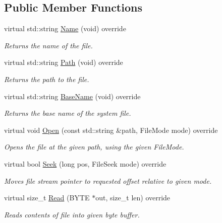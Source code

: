 \subsection*{Public Member Functions}
\begin{DoxyCompactItemize}
\item 
virtual std\+::string \hyperlink{classHatchit_1_1Core_1_1File_acf299b9ad7d5362e69ce5e2da1613887}{Name} (void) override
\begin{DoxyCompactList}\small\item\em Returns the name of the file. \end{DoxyCompactList}\item 
virtual std\+::string \hyperlink{classHatchit_1_1Core_1_1File_ad7c6f4473dba9f55fa06095180e8b49f}{Path} (void) override
\begin{DoxyCompactList}\small\item\em Returns the path to the file. \end{DoxyCompactList}\item 
virtual std\+::string \hyperlink{classHatchit_1_1Core_1_1File_a59e1437b18943479de2f6c4234b3eb40}{Base\+Name} (void) override
\begin{DoxyCompactList}\small\item\em Returns the base name of the system file. \end{DoxyCompactList}\item 
virtual void \hyperlink{classHatchit_1_1Core_1_1File_a86b433cd9a4c10cad0bdacba9d4ae770}{Open} (const std\+::string \&path, File\+Mode mode) override
\begin{DoxyCompactList}\small\item\em Opens the file at the given path, using the given File\+Mode. \end{DoxyCompactList}\item 
virtual bool \hyperlink{classHatchit_1_1Core_1_1File_a3cf429a1d4538e301b74fad16e4b5c88}{Seek} (long pos, File\+Seek mode) override
\begin{DoxyCompactList}\small\item\em Moves file stream pointer to requested offset relative to given mode. \end{DoxyCompactList}\item 
virtual size\+\_\+t \hyperlink{classHatchit_1_1Core_1_1File_aa301dd426e9787589b2fcfce6fb25a15}{Read} (B\+Y\+TE $\ast$out, size\+\_\+t len) override
\begin{DoxyCompactList}\small\item\em Reads contents of file into given byte buffer. \end{DoxyCompactList}\item 

\end{DoxyCompactItemize}
